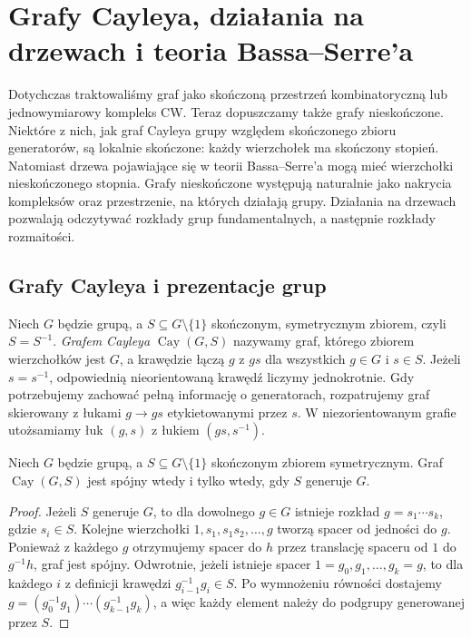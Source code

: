 \chapter{Grafy Cayleya, działania na drzewach i teoria Bassa--Serre'a}
\label{ch:tg-bass-serre}

Dotychczas traktowaliśmy graf jako skończoną przestrzeń kombinatoryczną lub
jednowymiarowy kompleks CW. Teraz dopuszczamy także grafy nieskończone. Niektóre z nich,
jak graf Cayleya grupy względem skończonego zbioru generatorów,
są lokalnie skończone: każdy wierzchołek ma skończony stopień.
Natomiast drzewa pojawiające się w teorii Bassa--Serre'a mogą
mieć wierzchołki nieskończonego stopnia. Grafy nieskończone
występują naturalnie jako nakrycia kompleksów oraz przestrzenie,
na których działają grupy. Działania na drzewach pozwalają
odczytywać rozkłady grup fundamentalnych, a następnie rozkłady rozmaitości.

\section{Grafy Cayleya i prezentacje grup}
\label{sec:tg-cayley}

\begin{definicja}
Niech $G$ będzie grupą, a $S\subseteq G\setminus\{1\}$
skończonym, symetrycznym zbiorem, czyli $S=S^{-1}$.
\emph{Grafem Cayleya} $\operatorname{Cay}(G,S)$ nazywamy graf,
którego zbiorem wierzchołków jest $G$, a krawędzie łączą
$g$ z $gs$ dla wszystkich $g\in G$ i $s\in S$.
Jeżeli $s=s^{-1}$, odpowiednią nieorientowaną krawędź liczymy
jednokrotnie. Gdy potrzebujemy zachować pełną informację o generatorach,
rozpatrujemy graf skierowany z łukami $g\to gs$
etykietowanymi przez $s$. W niezorientowanym grafie
utożsamiamy łuk $(g,s)$ z łukiem $(gs,s^{-1})$.
\end{definicja}

\begin{stwierdzenie}
Niech $G$ będzie grupą, a $S\subseteq G\setminus\{1\}$
skończonym zbiorem symetrycznym. Graf $\operatorname{Cay}(G,S)$
jest spójny wtedy i tylko wtedy, gdy $S$ generuje $G$.
\end{stwierdzenie}
\begin{proof}
Jeżeli $S$ generuje $G$, to dla dowolnego $g\in G$ istnieje
rozkład $g=s_1\cdots s_k$, gdzie $s_i\in S$. Kolejne
wierzchołki $1,s_1,s_1s_2,\ldots,g$ tworzą spacer od
jedności do $g$. Ponieważ z każdego $g$ otrzymujemy
spacer do $h$ przez translację spaceru od $1$ do
$g^{-1}h$, graf jest spójny. Odwrotnie, jeżeli istnieje
spacer $1=g_0,g_1,\ldots,g_k=g$, to dla każdego $i$
z definicji krawędzi $g_{i-1}^{-1}g_i\in S$.
Po wymnożeniu równości dostajemy
$g=(g_0^{-1}g_1)\cdots(g_{k-1}^{-1}g_k)$, a więc
każdy element należy do podgrupy generowanej przez $S$.
\end{proof}

